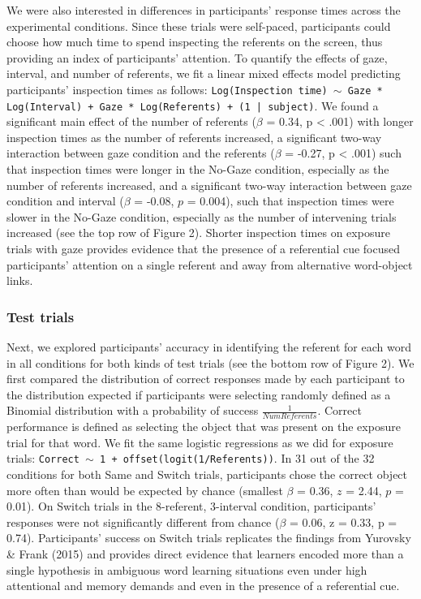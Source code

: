 \documentclass[authoryear, review]{elsarticle}
\begin{document}
We were also interested in differences in participants' response times
across the experimental conditions. Since these trials were self-paced,
participants could choose how much time to spend inspecting the
referents on the screen, thus providing an index of participants'
attention. To quantify the effects of gaze, interval, and number of
referents, we fit a linear mixed effects model predicting participants'
inspection times as follows:
\texttt{Log(Inspection time) $\sim$ Gaze * Log(Interval) + Gaze * Log(Referents) + (1 | subject)}.
We found a significant main effect of the number of referents (\(\beta\)
= 0.34, p \textless{} .001) with longer inspection times as the number
of referents increased, a significant two-way interaction between gaze
condition and the referents (\(\beta\) = -0.27, p \textless{} .001) such
that inspection times were longer in the No-Gaze condition, especially
as the number of referents increased, and a significant two-way
interaction between gaze condition and interval (\(\beta\) = -0.08,
\(p\) = 0.004), such that inspection times were slower in the No-Gaze
condition, especially as the number of intervening trials increased (see
the top row of Figure 2). Shorter inspection times on exposure trials
with gaze provides evidence that the presence of a referential cue
focused participants' attention on a single referent and away from
alternative word-object links.

\subsubsection{Test trials}\label{test-trials}

Next, we explored participants' accuracy in identifying the referent for
each word in all conditions for both kinds of test trials (see the
bottom row of Figure 2). We first compared the distribution of correct
responses made by each participant to the distribution expected if
participants were selecting randomly defined as a Binomial distribution
with a probability of success \(\frac{1}{Num Referents}\). Correct
performance is defined as selecting the object that was present on the
exposure trial for that word. We fit the same logistic regressions as we
did for exposure trials:
\texttt{Correct $\sim$ 1 + offset(logit(1/Referents))}. In 31 out of the
32 conditions for both Same and Switch trials, participants chose the
correct object more often than would be expected by chance (smallest
\(\beta\) = 0.36, \(z\) = 2.44, \(p\) = 0.01). On Switch trials in the
8-referent, 3-interval condition, participants' responses were not
significantly different from chance (\(\beta\) = 0.06, z = 0.33, p =
0.74). Participants' success on Switch trials replicates the findings
from Yurovsky \& Frank (2015) and provides direct evidence that learners
encoded more than a single hypothesis in ambiguous word learning
situations even under high attentional and memory demands and even in
the presence of a referential cue.
\end{document}
